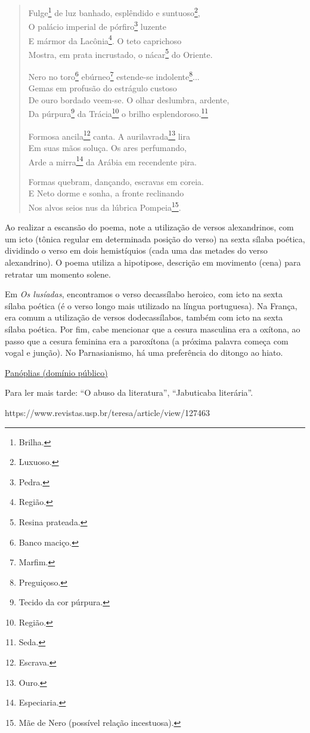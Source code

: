 \begin{verse}
Fulge\footnote{Brilha.} de luz banhado, esplêndido e suntuoso\footnote{Luxuoso.}, \\
O palácio imperial de pórfiro\footnote{Pedra.} luzente \\
E mármor da Lacônia\footnote{Região.}. O teto caprichoso \\
Mostra, em prata incrustado, o nácar\footnote{Resina prateada.} do Oriente.

Nero no toro\footnote{Banco maciço.} ebúrneo\footnote{Marfim.} estende-se indolente\footnote{Preguiçoso.}... \\
Gemas em profusão do estrágulo custoso \\
De ouro bordado veem-se. O olhar deslumbra, ardente, \\
Da púrpura\footnote{Tecido da cor púrpura.} da Trácia\footnote{Região.} o brilho esplendoroso.\footnote{Seda.}

Formosa ancila\footnote{Escrava.} canta. A aurilavrada\footnote{Ouro.} lira \\
Em suas mãos soluça. Os ares perfumando, \\
Arde a mirra\footnote{Especiaria.} da Arábia em recendente pira.

Formas quebram, dançando, escravas em coreia. \\
E Neto dorme e sonha, a fronte reclinando \\
Nos alvos seios nus da lúbrica Pompeia\footnote{Mãe de Nero (possível relação incestuosa).}.
\end{verse}

Ao realizar a escansão do poema, note a utilização de versos alexandrinos, com um icto (tônica regular em determinada posição do verso) na sexta sílaba poética, dividindo o verso em dois hemistíquios (cada uma das metades do verso alexandrino). O poema utiliza a hipotipose, descrição em movimento (cena) para retratar um momento solene.

Em \textit{Os lusíadas}, encontramos o verso decassílabo heroico, com icto na sexta sílaba poética (é o verso longo mais utilizado na língua portuguesa). Na França, era comum a utilização de versos dodecassílabos, também com icto na sexta sílaba poética. Por fim, cabe mencionar que a cesura masculina era a oxítona, ao passo que a cesura feminina era a paroxítona (a próxima palavra começa com vogal e junção). No Parnasianismo, há uma preferência do ditongo ao hiato.

\href{http://www.dominiopublico.gov.br/pesquisa/DetalheObraForm.do?select_action=&co_obra=7564}{Panóplias (domínio público)}

Para ler mais tarde: ``O abuso da literatura'', ``Jabuticaba literária''.

https://www.revistas.usp.br/teresa/article/view/127463